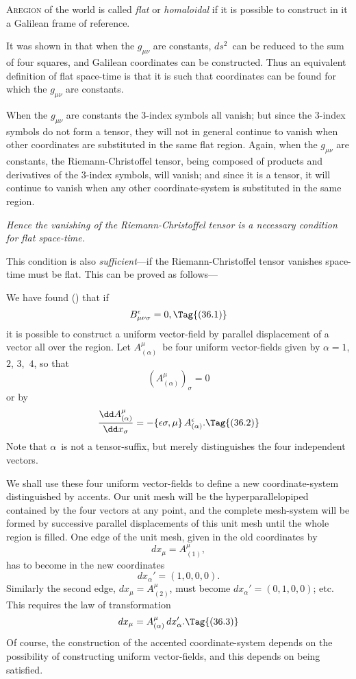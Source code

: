 \documentclass[12pt]{book}
\begin{document}
\lettrine{A}{region} of the world is called \emph{flat} or \emph{homaloidal} if it is possible to
construct in it a Galilean frame of reference.

It was shown in  that when the $g_{\mu\nu}$ are constants, $ds^{2}$~can be reduced
to the sum of four squares, and Galilean coordinates can be constructed. Thus
an equivalent definition of flat space-time is that it is such that coordinates
can be found for which the $g_{\mu\nu}$ are constants.

When the $g_{\mu\nu}$ are constants the $3$-index symbols all vanish; but since the
$3$-index symbols do not form a tensor, they will not in general continue to
vanish when other coordinates are substituted in the same flat region. Again,
when the $g_{\mu\nu}$ are constants, the Riemann-Christoffel tensor, being composed
%
of products and derivatives of the $3$-index symbols, will vanish; and since it
is a tensor, it will continue to vanish when any other coordinate-system is
substituted in the same region.

\emph{Hence the vanishing of the Riemann-Christoffel tensor is a necessary condition
for flat space-time.}

This condition is also \emph{sufficient}---if the Riemann-Christoffel tensor vanishes
space-time must be flat. This can be proved as follows---

We have found () that if
\[
B_{\mu\nu\sigma}^{\epsilon} = 0,
\Tag{(36.1)}
\]
it is possible to construct a uniform vector-field by parallel displacement of
a vector all over the region. Let $A_{(\alpha)}^{\mu}$~be four uniform vector-fields given by
$\alpha = 1$, $2$, $3$,~$4$, so that
\[
(A_{(\alpha)}^{\mu})_{\sigma} = 0
\]
or by~
\[
\frac{\dd A_{(\alpha)}^{\mu}}{\dd x_{\sigma}}
= -\{\epsilon\sigma, \mu\}\, A_{(\alpha)}^{\epsilon}.
\Tag{(36.2)}
\]
Note that $\alpha$~is not a tensor-suffix, but merely distinguishes the four independent
vectors.

We shall use these four uniform vector-fields to define a new coordinate-system
distinguished by accents. Our unit mesh will be the hyperparallelopiped
contained by the four vectors at any point, and the complete mesh-system
will be formed by successive parallel displacements of this unit mesh
until the whole region is filled. One edge of the unit mesh, given in the old
coordinates by
\[
dx_{\mu} = A_{(1)}^{\mu},
\]
has to become in the new coordinates
\[
dx_{\alpha}' = (1, 0, 0, 0).
\]
Similarly the second edge, $dx_{\mu} = A_{(2)}^{\mu}$, must become $dx_{\alpha}' = (0, 1, 0, 0)$; etc.
This requires the law of transformation
\[
dx_{\mu} = A_{(\alpha)}^{\mu}\, dx_{\alpha}'.
\Tag{(36.3)}
\]
Of course, the construction of the accented coordinate-system depends on the
possibility of constructing uniform vector-fields, and this depends on 
%
being satisfied.
\end{document}
